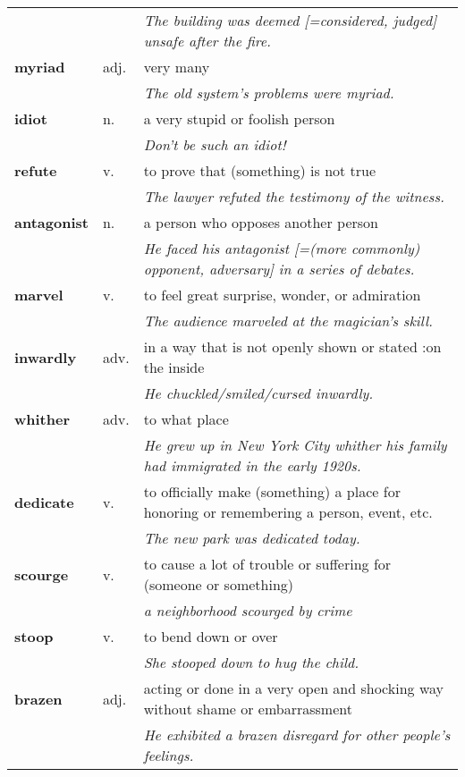 \documentclass[a4paper]{article}
\begin{document}
\begin{longtable}{llp{11cm}}
 & & \textit{The building was deemed [=considered, judged] unsafe after the fire.}\\[0.08cm]
\textbf{myriad} & adj. &  very many \\
 & & \textit{The old system's problems were myriad.}\\[0.08cm]
\textbf{idiot} & n. &  a very stupid or foolish person \\
 & & \textit{Don't be such an idiot!}\\[0.08cm]
\textbf{refute} & v. &  to prove that (something) is not true \\
 & & \textit{The lawyer refuted the testimony of the witness.}\\[0.08cm]
\textbf{antagonist} & n. &  a person who opposes another person \\
 & & \textit{He faced his antagonist [=(more commonly) opponent, adversary] in a series of debates.}\\[0.08cm]
\textbf{marvel} & v. &  to feel great surprise, wonder, or admiration \\
 & & \textit{The audience marveled at the magician's skill.}\\[0.08cm]
\textbf{inwardly} & adv. &  in a way that is not openly shown or stated :on the inside \\
 & & \textit{He chuckled/smiled/cursed inwardly.}\\[0.08cm]
\textbf{whither} & adv. &  to what place \\
 & & \textit{He grew up in New York City whither his family had immigrated in the early 1920s.}\\[0.08cm]
\textbf{dedicate} & v. &  to officially make (something) a place for honoring or remembering a person, event, etc. \\
 & & \textit{The new park was dedicated today.}\\[0.08cm]
\textbf{scourge} & v. &  to cause a lot of trouble or suffering for (someone or something) \\
 & & \textit{a neighborhood scourged by crime}\\[0.08cm]
\textbf{stoop} & v. &  to bend down or over \\
 & & \textit{She stooped down to hug the child.}\\[0.08cm]
\textbf{brazen} & adj. &  acting or done in a very open and shocking way without shame or embarrassment \\
 & & \textit{He exhibited a brazen disregard for other people's feelings.}\\[0.08cm]

\end{longtable}
\end{document}
